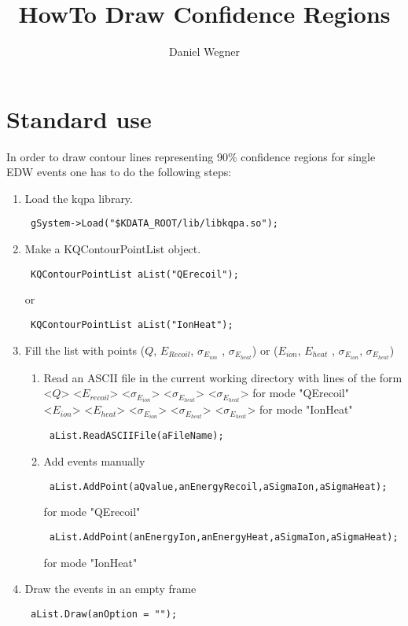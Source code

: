 \documentclass[10pt, a4paper]{article}
\title{HowTo Draw Confidence Regions}
\author{Daniel Wegner}
\begin{document}
\maketitle

\section{Standard use}

In order to draw contour lines representing 90\% confidence regions for single EDW events one has to do the following steps:

\begin{enumerate}
\item Load the kqpa library.
\begin{verbatim} gSystem->Load("$KDATA_ROOT/lib/libkqpa.so"); \end{verbatim}
\item Make a KQContourPointList object.
\begin{verbatim} KQContourPointList aList("QErecoil"); \end{verbatim}
or 
\begin{verbatim} KQContourPointList aList("IonHeat"); \end{verbatim}
\item Fill the list with points ($Q$, $E_{Recoil}$, $\sigma_{E_{ion}}$ , $\sigma_{E_{heat}}$) or ($E_{ion}$, $E_{heat}$ , $\sigma_{E_{ion}}$, $\sigma_{E_{heat}}$)

\begin{enumerate}
\item Read an ASCII file in the current working directory with lines of the form \\ <$Q$> <$E_{recoil}$> <$\sigma_{E_{ion}}$> <$\sigma_{E_{heat}}$> <$\sigma_{E_{heat}}$> for mode "QErecoil" \\
 <$E_{ion}$> <$E_{heat}$> <$\sigma_{E_{ion}}$> <$\sigma_{E_{heat}}$> <$\sigma_{E_{heat}}$> for mode "IonHeat"
\begin{verbatim} aList.ReadASCIIFile(aFileName); \end{verbatim}
\item Add events manually
\begin{verbatim} aList.AddPoint(aQvalue,anEnergyRecoil,aSigmaIon,aSigmaHeat); \end{verbatim} for mode "QErecoil"
\begin{verbatim} aList.AddPoint(anEnergyIon,anEnergyHeat,aSigmaIon,aSigmaHeat); \end{verbatim} for mode "IonHeat"
\end{enumerate}
\item Draw the events in an empty frame
\begin{verbatim} aList.Draw(anOption = ""); \end{verbatim}
\end{enumerate}
\end{document}
